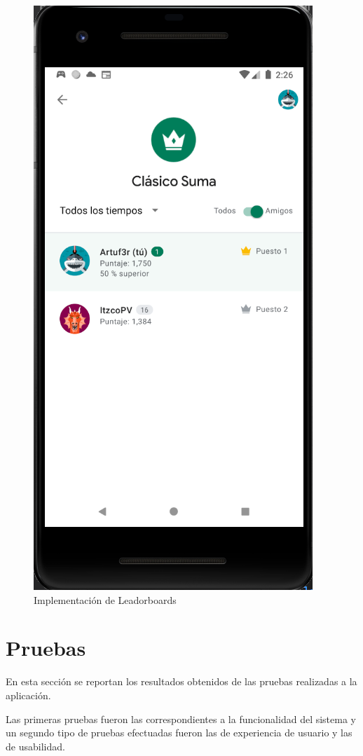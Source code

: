 \documentclass{article}
\begin{document}
\begin{figure}[H]
    \centering
    \includegraphics[scale=0.8]{imgs/Imp/Leaderboards}
    \caption{Implementación de Leadorboards}
\end{figure}


\section{Pruebas}
En esta sección se reportan los resultados obtenidos de las pruebas realizadas a la 
aplicación.

Las primeras pruebas fueron las correspondientes a la funcionalidad del sistema y 
un segundo tipo de pruebas efectuadas fueron las de experiencia de usuario y las 
de usabilidad.
\end{document}
